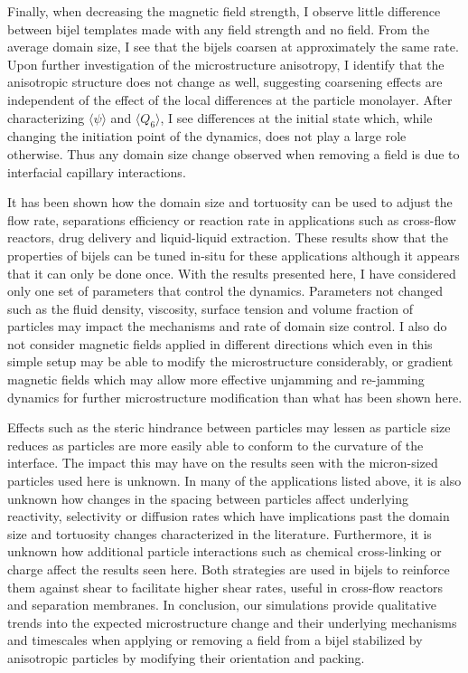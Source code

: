 Finally, when decreasing the magnetic field strength, I observe little difference between bijel templates made with any field strength and no field. From the average domain 
size, I see that the bijels coarsen at approximately the same rate. Upon further investigation of the microstructure anisotropy, I identify that the anisotropic structure 
does not change as well, suggesting coarsening effects are independent of the effect of the local differences at the particle monolayer. After characterizing 
$\langle \psi \rangle$ and $\langle Q_6 \rangle$, I see differences at the initial state which, while changing the initiation point of the dynamics, does not play a large
 role otherwise. Thus any domain size change observed when removing a field is due to interfacial capillary interactions. 

It has been shown how the domain size and tortuosity can be used to adjust the flow rate, separations efficiency or reaction rate in applications such as cross-flow reactors, 
drug delivery and liquid-liquid extraction. These results show that the properties of bijels can be tuned in-situ for these applications although it appears that it can only 
be done once. With the results presented here, I have considered only one set of parameters that control the dynamics. Parameters not changed such as the fluid density, 
viscosity, surface tension and volume fraction of particles may impact the mechanisms and rate of domain size control. I also do not consider magnetic 
fields applied in different directions which even in this simple setup may be able to modify the microstructure considerably, or gradient magnetic fields which may allow 
more effective unjamming and re-jamming dynamics for further microstructure modification than what has been shown here.

Effects such as the steric hindrance between particles may lessen as particle size reduces as particles are more easily able to conform to the curvature of the interface. 
The impact this may have on the results seen with the micron-sized particles used here is unknown. In many of the applications listed above, it is also unknown how changes 
in the spacing between particles affect underlying reactivity, selectivity or diffusion rates which have implications past the domain size and tortuosity changes characterized 
in the literature. Furthermore, it is unknown how additional particle interactions such as chemical cross-linking or charge affect the results seen here. Both strategies are 
used in bijels to reinforce them against shear to facilitate higher shear rates, useful in cross-flow reactors and separation membranes. In conclusion, our simulations provide 
qualitative trends into the expected microstructure change and their underlying mechanisms and timescales when applying or removing a field from a bijel stabilized by 
anisotropic particles by modifying their orientation and packing.